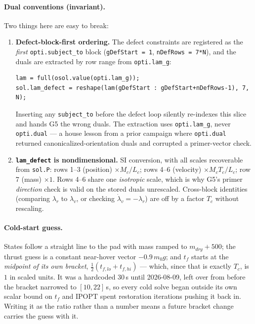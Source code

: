 \documentclass[11pt]{article}
\begin{document}
\paragraph{Dual conventions (invariant).} Two things here are easy to break:

\begin{enumerate}
\item \textbf{Defect-block-first ordering.} The defect constraints are
registered as the \emph{first} \texttt{opti.subject\_to} block
(\texttt{gDefStart = 1}, \texttt{nDefRows = 7*N}), and the duals are
extracted by row range from \texttt{opti.lam\_g}:
\begin{verbatim}
lam = full(osol.value(opti.lam_g));
sol.lam_defect = reshape(lam(gDefStart : gDefStart+nDefRows-1), 7, N);
\end{verbatim}
Inserting any \texttt{subject\_to} before the defect loop silently
re-indexes this slice and hands G5 the wrong duals. The extraction uses
\texttt{opti.lam\_g}, never \texttt{opti.dual} --- a house lesson from a
prior campaign where \texttt{opti.dual} returned canonicalized-orientation
duals and corrupted a primer-vector check.
\item \textbf{\texttt{lam\_defect} is nondimensional.} SI conversion, with
all scales recoverable from \texttt{sol.P}: rows 1--3 (position)
$\times M_c/L_c$; rows 4--6 (velocity) $\times M_cT_c/L_c$; row 7 (mass)
$\times 1$. Rows 4--6 share one \emph{isotropic} scale, which is why G5's
primer \emph{direction} check is valid on the stored duals unrescaled.
Cross-block identities (comparing $\lambda_r$ to $\lambda_v$, or checking
$\dot\lambda_v = -\lambda_r$) are off by a factor $T_c$ without rescaling.
\end{enumerate}

\paragraph{Cold-start guess.} States follow a straight line to the pad with
mass ramped to $m_{dry}+500$; the thrust guess is a constant near-hover
vector $-0.9\,m_0 g$; and $t_f$ starts at the \emph{midpoint of its own
bracket}, $\tfrac12(t_{f,lo}+t_{f,hi})$ --- which, since that is exactly
$T_c$, is $1$ in scaled units. It was a hardcoded $30$\,s until 2026-08-09,
left over from before the bracket narrowed to $[10,22]$\,s, so every cold
solve began outside its own scalar bound on $t_f$ and IPOPT spent
restoration iterations pushing it back in. Writing it as the ratio rather
than a number means a future bracket change carries the guess with it.
\end{document}
